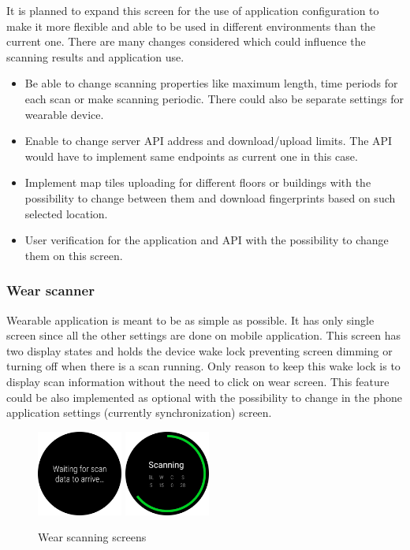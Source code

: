 It is planned to expand this screen for the use of application configuration to make it more flexible and able to be used in different environments than the current one. There are many changes considered which could influence the scanning results and application use.

\begin{itemize}
	\item Be able to change scanning properties like maximum length, time periods for each scan or make scanning periodic. There could also be separate settings for wearable device.
	\item Enable to change server API address and download/upload limits. The API would have to implement same endpoints as current one in this case.
	\item Implement map tiles uploading for different floors or buildings with the possibility to change between them and download fingerprints based on such selected location.
	\item User verification for the application and API with the possibility to change them on this screen.
\end{itemize}

\subsubsection{Wear scanner}\label{subsec:WearableScanner}
Wearable application is meant to be as simple as possible. It has only single screen since all the other settings are done on mobile application. This screen has two display states and holds the device wake lock preventing screen dimming or turning off when there is a scan running. Only reason to keep this wake lock is to display scan information without the need to click on wear screen. This feature could be also implemented as optional with the possibility to change in the phone application settings (currently synchronization) screen. 

\begin{figure}[H]
	\begin{centering}
		\includegraphics[width=0.25\textwidth]{img/wear_waiting_edited}
		\hspace{0.5cm}
		\includegraphics[width=0.25\textwidth]{img/wear_scanning_edited}
		\par\end{centering}
	\caption{Wear scanning screens}
	\label{fig09c05}
\end{figure}


